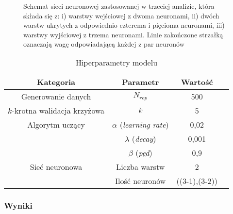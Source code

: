\documentclass[11pt]{book}
\theoremstyle{definition}
\begin{document}
\begin{SCfigure}[][h]
{\begin{tikzpicture}
	
	
	
	
		\end{tikzpicture}}
	\caption{Schemat sieci neuronowej zastosowanej w trzeciej analizie, która składa się z: i) warstwy wejściowej z dwoma neuronami, ii) dwóch warstw ukrytych z odpowiednio czterema i pięcioma neuronami, iii) warstwy wyjściowej z trzema neuronami. Linie zakończone strzałką oznaczają wagę odpowiadającą każdej z par neuronów} \label{tab:scheme3} 	
\end{SCfigure}


\begin{table}
	\centering
	\caption{Hiperparametry modelu}\label{tab:hyper3} 
	\begin{tabular}{c|c c c}
		\hline 
		Kategoria & Parametr & Wartość &   \\\hline
		Generowanie danych & $N_{rep}$ & 500 & \\ \hline
		$k$-krotna walidacja krzyżowa & $k$ & 5 &\\ \hline
		
		Algorytm uczący& $\alpha$ (\textit{learning rate}) & 0,02 & \\
		& $\lambda$ (\textit{decay}) & 0,001 & \\ 
		& $\beta$ (\textit{pęd}) & 0,9 & \\ \hline
		Sieć neuronowa & Liczba warstw & 2 & \\ 
		& Ilość neuronów & ((3-1),(3-2)) & \\ \hline
		
	\end{tabular}
\end{table}


\subsubsection{Wyniki}
%
%
\end{document}
